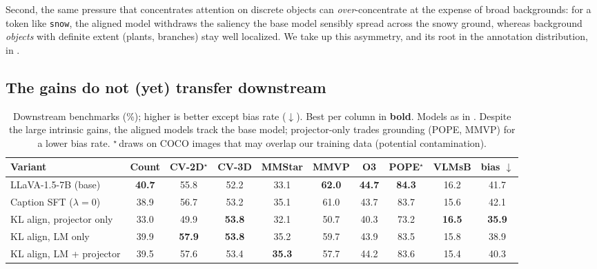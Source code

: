 Second, the same pressure that concentrates attention on discrete objects can \emph{over}-concentrate at the expense of broad backgrounds: for a token like \texttt{snow}, the aligned model withdraws the saliency the base model sensibly spread across the snowy ground, whereas background \emph{objects} with definite extent (plants, branches) stay well localized. We take up this asymmetry, and its root in the annotation distribution, in .

\subsection{The gains do not (yet) transfer downstream}
\label{sec:results-bench}

\begin{table}[t]
\centering
\caption{Downstream benchmarks (\%); higher is better except bias rate ($\downarrow$). Best per column in \textbf{bold}. Models as in . Despite the large intrinsic gains, the aligned models track the base model; projector-only trades grounding (POPE, MMVP) for a lower bias rate. $^{\star}$\,draws on COCO images that may overlap our training data (potential contamination).}
\label{tab:bench}
\vskip 0.1in
\small
\setlength{\tabcolsep}{5pt}
\begin{tabular}{lccccccccc}
\toprule
Variant & Count & CV-2D$^{\star}$ & CV-3D & MMStar & MMVP & O3 & POPE$^{\star}$ & VLMsB & bias $\downarrow$ \\
\midrule
LLaVA-1.5-7B (base)        & \textbf{40.7} & 55.8 & 52.2 & 33.1 & \textbf{62.0} & \textbf{44.7} & \textbf{84.3} & 16.2 & 41.7 \\
Caption SFT ($\lambda{=}0$) & 38.9 & 56.7 & 53.2 & 35.1 & 61.0 & 43.7 & 83.7 & 15.6 & 42.1 \\
KL align, projector only   & 33.0 & 49.9 & \textbf{53.8} & 32.1 & 50.7 & 40.3 & 73.2 & \textbf{16.5} & \textbf{35.9} \\
KL align, LM only          & 39.9 & \textbf{57.9} & \textbf{53.8} & 35.2 & 59.7 & 43.9 & 83.5 & 15.8 & 38.9 \\
KL align, LM + projector   & 39.5 & 57.6 & 53.4 & \textbf{35.3} & 57.7 & 44.2 & 83.6 & 15.4 & 40.3 \\
\bottomrule
\end{tabular}
\end{table}

